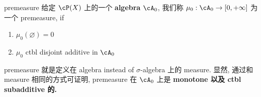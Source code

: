 \documentclass[lang=cn,11pt]{elegantbook}
\begin{document}
\begin{definition}{premeasure}
给定 $\cP(X)$ 上的一个 \textbf{algebra} $\cA_0$, 我们称 \(\mu_0: \cA_0 \rar [0,+\infty]\)  为一个 premeasure, if
\begin{enumerate}
    \item \(\mu_0(\varnothing)  = 0\)
    \item \(\mu_0\) ctbl disjoint additive in $\cA_0$
\end{enumerate}
\end{definition}

\begin{remark}
premeasure 就是定义在 algebra instead of $\sigma$-algebra 上的 measure. 显然, 通过和 measure 相同的方式可证明, premeasure 在 $\cA_0$ 上是 \textbf{monotone 以及 ctbl subadditive 的.  }  
\end{remark}
\end{document}
